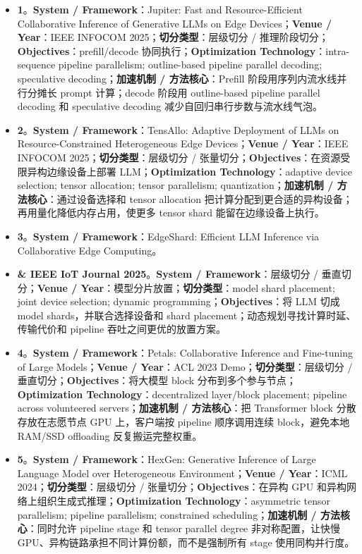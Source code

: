 \documentclass[a4paper,twocolumn,10pt]{ctexart}
\begin{document}
\begin{itemize}
\item \textbf{1}。\textbf{System / Framework}：Jupiter: Fast and Resource-Efficient Collaborative Inference of Generative LLMs on Edge Devices；\textbf{Venue / Year}：IEEE INFOCOM 2025；\textbf{切分类型}：层级切分 / 推理阶段切分；\textbf{Objectives}：prefill/decode 协同执行；\textbf{Optimization Technology}：intra-sequence pipeline parallelism; outline-based pipeline parallel decoding; speculative decoding；\textbf{加速机制 / 方法核心}：Prefill 阶段用序列内流水线并行分摊长 prompt 计算；decode 阶段用 outline-based pipeline parallel decoding 和 speculative decoding 减少自回归串行步数与流水线气泡。
\item \textbf{2}。\textbf{System / Framework}：TensAllo: Adaptive Deployment of LLMs on Resource-Constrained Heterogeneous Edge Devices；\textbf{Venue / Year}：IEEE INFOCOM 2025；\textbf{切分类型}：层级切分 / 张量切分；\textbf{Objectives}：在资源受限异构边缘设备上部署 LLM；\textbf{Optimization Technology}：adaptive device selection; tensor allocation; tensor parallelism; quantization；\textbf{加速机制 / 方法核心}：通过设备选择和 tensor allocation 把计算分配到更合适的异构设备；再用量化降低内存占用，使更多 tensor shard 能留在边缘设备上执行。
\item \textbf{3}。\textbf{System / Framework}：EdgeShard: Efficient LLM Inference via Collaborative Edge Computing。
\item \textbf{\& IEEE IoT Journal 2025}。\textbf{System / Framework}：层级切分 / 垂直切分；\textbf{Venue / Year}：模型分片放置；\textbf{切分类型}：model shard placement; joint device selection; dynamic programming；\textbf{Objectives}：将 LLM 切成 model shards，并联合选择设备和 shard placement；动态规划寻找计算时延、传输代价和 pipeline 吞吐之间更优的放置方案。
\item \textbf{4}。\textbf{System / Framework}：Petals: Collaborative Inference and Fine-tuning of Large Models；\textbf{Venue / Year}：ACL 2023 Demo；\textbf{切分类型}：层级切分 / 垂直切分；\textbf{Objectives}：将大模型 block 分布到多个参与节点；\textbf{Optimization Technology}：decentralized layer/block placement; pipeline across volunteered servers；\textbf{加速机制 / 方法核心}：把 Transformer block 分散存放在志愿节点 GPU 上，客户端按 pipeline 顺序调用连续 block，避免本地 RAM/SSD offloading 反复搬运完整权重。
\item \textbf{5}。\textbf{System / Framework}：HexGen: Generative Inference of Large Language Model over Heterogeneous Environment；\textbf{Venue / Year}：ICML 2024；\textbf{切分类型}：层级切分 / 张量切分；\textbf{Objectives}：在异构 GPU 和异构网络上组织生成式推理；\textbf{Optimization Technology}：asymmetric tensor parallelism; pipeline parallelism; constrained scheduling；\textbf{加速机制 / 方法核心}：同时允许 pipeline stage 和 tensor parallel degree 非对称配置，让快慢 GPU、异构链路承担不同计算份额，而不是强制所有 stage 使用同构并行度。

\end{itemize}
\end{document}
